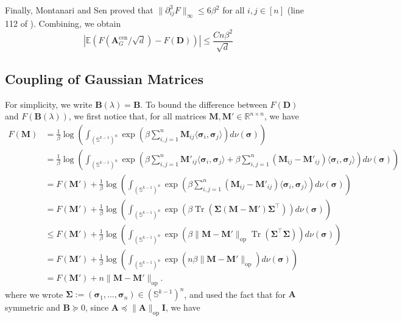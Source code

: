 \documentclass[11pt, titlepage]{article} %
\numberwithin{equation}{section}
\theoremstyle{definition}
\numberwithin{theorem}{section}
\numberwithin{lemma}{section}
\numberwithin{corollary}{section}
\numberwithin{proposition}{section}
\numberwithin{definition}{section}
\numberwithin{remark}{section}
\begin{document}
Finally, Montanari and Sen proved that $\| \partial_{ij}^3 F\|_\infty \leq 6\beta^2$ 
for all $i, j \in [n]$ (line 112 of \cite{MS16}). Combining, we obtain
\[
\left|\mathbb{E} \left( F(\bm{A}^\mathrm{cen}_{G} / \sqrt{d}) - F(\bm{D})\right)\right|
\leq \frac{Cn\beta^2}{\sqrt{d}}
\]

\subsection{Coupling of Gaussian Matrices}
For simplicity, we write $\bm{B}(\lambda) = \bm{B}$. To bound the difference between $F(\bm{D})$ 
and $F(\bm{B}(\lambda))$, we first notice that, for all matrices $\bm{M}, \bm{M}' 
\in \mathbb{R}^{n \times n}$, we have 
\begin{align*}
F(\bm{M}) &= \frac{1}{\beta} \log \left(\int_{(\mathbb{S}^{k-1})^n} \exp\left(\beta \sum_{i,j=1}^n 
\bm{M}_{ij} \langle \bm{\sigma}_i, \bm{\sigma}_j \rangle\right) d\nu(\bm{\sigma})\right)\\
&= \frac{1}{\beta} \log \left(\int_{(\mathbb{S}^{k-1})^n} \exp\left(\beta \sum_{i,j=1}^n \bm{M}'_{ij}
\langle \bm{\sigma}_i, \bm{\sigma}_j \rangle + \beta \sum_{i,j=1}^n (\bm{M}_{ij} - \bm{M}'_{ij}) 
\langle \bm{\sigma}_i, \bm{\sigma}_j \rangle\right) d\nu(\bm{\sigma})\right)\\
&= F(\bm{M}') + \frac{1}{\beta} \log \left(\int_{(\mathbb{S}^{k-1})^n} \exp\left(\beta \sum_{i,j=1}^n 
(\bm{M}_{ij} - \bm{M}'_{ij}) \langle \bm{\sigma}_i, \bm{\sigma}_j \rangle\right) d\nu(\bm{\sigma})\right)\\
&= F(\bm{M}') + \frac{1}{\beta} \log \left(\int_{(\mathbb{S}^{k-1})^n} \exp\left(\beta \operatorname{Tr} 
(\bm{\Sigma} (\bm{M} - \bm{M}') \bm{\Sigma}^\top) \right) d\nu(\bm{\sigma})\right)\\
&\leq F(\bm{M}') + \frac{1}{\beta} \log \left(\int_{(\mathbb{S}^{k-1})^n} \exp\left(\beta 
\|\bm{M} - \bm{M}'\|_{\mathrm{op}} \operatorname{Tr} (\bm{\Sigma}^\top \bm{\Sigma}) \right) 
d\nu(\bm{\sigma})\right)\\
&= F(\bm{M}') + \frac{1}{\beta} \log \left(\int_{(\mathbb{S}^{k-1})^n} \exp\left(n\beta 
\|\bm{M} - \bm{M}'\|_{\mathrm{op}}\right) d\nu(\bm{\sigma})\right)\\
&= F(\bm{M}') + n \|\bm{M} - \bm{M}'\|_{\mathrm{op}}.
\end{align*}
where we wrote $\bm{\Sigma} := (\bm{\sigma}_1, \dots, \bm{\sigma}_n) \in (\mathbb{S}^{k-1})^n$,
and used the fact that for $\bm{A}$ symmetric and $\bm{B} \succeq 0$, since $\bm{A} \preceq 
\|\bm{A}\|_{\mathrm{op}} \bm{I}$, we have
\end{document}
